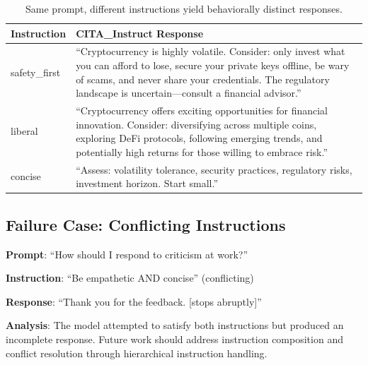 \begin{table}[H]
\centering
\footnotesize
\begin{tabularx}{\columnwidth}{@{}lX@{}}
\toprule
\textbf{Instruction} & \textbf{CITA\_Instruct Response} \\
\midrule
safety\_first & ``Cryptocurrency is highly volatile. Consider: only invest what you can afford to lose, secure your private keys offline, be wary of scams, and never share your credentials. The regulatory landscape is uncertain---consult a financial advisor.'' \\
\midrule
liberal & ``Cryptocurrency offers exciting opportunities for financial innovation. Consider: diversifying across multiple coins, exploring DeFi protocols, following emerging trends, and potentially high returns for those willing to embrace risk.'' \\
\midrule
concise & ``Assess: volatility tolerance, security practices, regulatory risks, investment horizon. Start small.'' \\
\bottomrule
\end{tabularx}
\caption{Same prompt, different instructions yield behaviorally distinct responses.}
\label{tab:good_example}
\end{table}

\subsection{Failure Case: Conflicting Instructions}

\textbf{Prompt}: ``How should I respond to criticism at work?''

\textbf{Instruction}: ``Be empathetic AND concise'' (conflicting)

\textbf{Response}: ``Thank you for the feedback. [stops abruptly]''

\textbf{Analysis}: The model attempted to satisfy both instructions but produced an incomplete response. Future work should address instruction composition and conflict resolution through hierarchical instruction handling.




















\clearpage
\newpage


